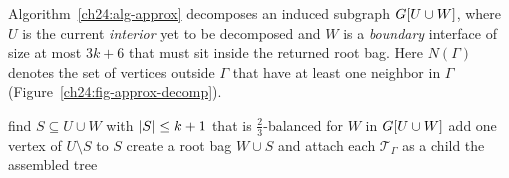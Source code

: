 Algorithm~\ref{ch24:alg-approx} decomposes an induced subgraph $G[U\cup W]$,
where $U$ is the current \emph{interior} yet to be decomposed and $W$ is a
\emph{boundary} interface of size at most $3k+6$ that must sit inside the returned
root bag. Here $N(\Gamma)$ denotes the set of vertices outside $\Gamma$ that have
at least one neighbor in $\Gamma$ (Figure~\ref{ch24:fig-approx-decomp}).

\begin{algorithm}[H]
\caption{\textsc{ApproxDecompose}$(U,W)$ -- decomposition of interior $U$ with boundary $W$}
\label{ch24:alg-approx}
find $S\subseteq U\cup W$ with $\lvert S\rvert\le k+1$ that is $\tfrac{2}{3}$-balanced for $W$ in $G[U\cup W]$\;
add one vertex of $U\setminus S$ to $S$
create a root bag $W\cup S$ and attach each $\mathcal{T}_\Gamma$ as a child\;
\Return the assembled tree\;
\end{algorithm}

